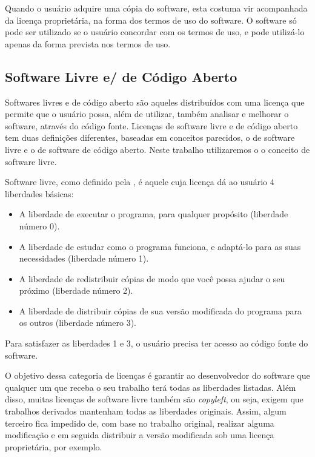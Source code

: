 Quando o usuário adquire uma cópia do software, esta costuma vir acompanhada da licença proprietária, na forma dos termos de uso do software. O software só pode ser utilizado se o usuário concordar com os termos de uso, e pode utilizá-lo apenas da forma prevista nos termos de uso.

\subsection{Software Livre e/ de Código Aberto}

Softwares livres e de código aberto são aqueles distribuídos com uma licença que permite que o usuário possa, além de utilizar, também analisar e melhorar o software, através do código fonte. Licenças de software livre e de código aberto tem duas definições diferentes, baseadas em conceitos parecidos, o de software livre e o de software de código aberto. Neste trabalho utilizaremos o o conceito de software livre.

Software livre, como definido pela , é aquele cuja licença dá ao usuário 4 liberdades básicas\cite{GNUFreeSoftware}:

\begin{itemize}

\item A liberdade de executar o programa, para qualquer propósito (liberdade número 0).
\item A liberdade de estudar como o programa funciona, e adaptá-lo para as suas necessidades (liberdade número 1).
\item A liberdade de redistribuir cópias de modo que você possa ajudar o seu próximo (liberdade número 2).
\item A liberdade de distribuir cópias de sua versão modificada do programa para os outros (liberdade número 3).

\end{itemize}

Para satisfazer as liberdades 1 e 3, o usuário precisa ter acesso ao código fonte do software.

O objetivo dessa categoria de licenças é garantir ao desenvolvedor do software que qualquer um que receba o seu trabalho terá todas as liberdades listadas. Além disso, muitas licenças de software livre também são \emph{copyleft}, ou seja, exigem que trabalhos derivados mantenham todas as liberdades originais. Assim, algum terceiro fica impedido de, com base no trabalho original, realizar alguma modificação e em seguida distribuir a versão modificada sob uma licença proprietária, por exemplo.

